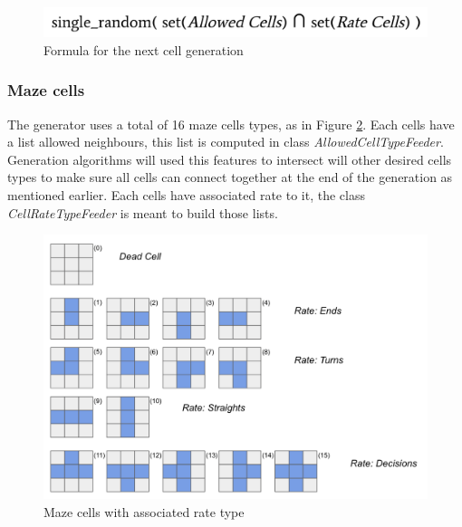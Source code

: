 \documentclass[review]{elsarticle}
\begin{document}
\begin{figure}
	\includegraphics[width=\linewidth]{next_decision_formula.png}
	\caption{Formula for the next cell generation}
	\label{fig:next_decision}
\end{figure}

\subsubsection{Maze cells}
The generator uses a total of 16 maze cells types, as in Figure \ref{fig:cells}. Each cells have a list allowed neighbours, this list is computed in class \textit{AllowedCellTypeFeeder}. Generation algorithms will used this features to intersect will other desired cells types to make sure all cells can connect together at the end of the generation as mentioned earlier. Each cells have associated rate to it, the class \textit{CellRateTypeFeeder} is meant to build those lists.

\begin{figure}
	\includegraphics[width=\linewidth]{maze_cells_clean.png}
	\caption{Maze cells with associated rate type}
	\label{fig:cells}
\end{figure}
\end{document}
